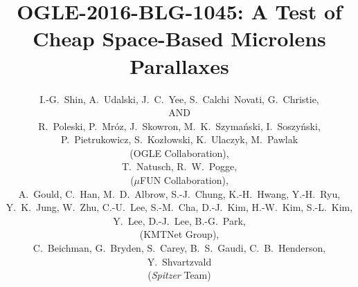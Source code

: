 \documentclass[10pt]{emulateapj}
\begin{document}
\title{
OGLE-2016-BLG-1045: A Test of Cheap Space-Based Microlens Parallaxes
}

\author{
I.-G.~Shin,
A.~Udalski,
J.~C.~Yee,
S.~Calchi~Novati,
G.~Christie,\\
AND\\
R.~Poleski,
P.~Mr\'oz,
J.~Skowron,
M.~K.~Szyma\'nski,
I.~Soszy\'nski,
P.~Pietrukowicz,
S.~Koz{\l}owski,
K.~Ulaczyk,
M.~Pawlak\\
(OGLE Collaboration),\\
T.~Natusch,
R.~W.~Pogge,\\
($\mu$FUN Collaboration),\\
A.~Gould, %
C.~Han,
M.~D.~Albrow,
S.-J.~Chung,
K.-H.~Hwang,
Y.-H.~Ryu,
Y.~K.~Jung,
W.~Zhu,
C.-U.~Lee,  %
S.-M.~Cha,   
D.-J.~Kim,
H.-W.~Kim,
S.-L.~Kim,
Y.~Lee,
D.-J.~Lee,
B.-G.~Park,\\
(KMTNet Group),\\
C.~Beichman,
G.~Bryden,
S.~Carey,
B.~S.~Gaudi,
C.~B.~Henderson,
Y.~Shvartzvald\\
({\it Spitzer} Team)\\
}

\bigskip\bigskip
\end{document}
